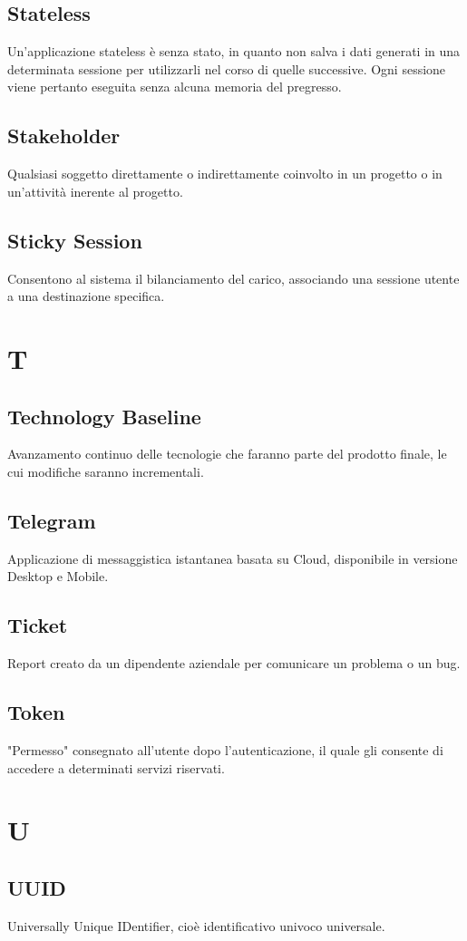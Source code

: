 \subsection{Stateless}
Un’applicazione stateless è senza stato, in quanto non salva i dati generati in una determinata sessione per utilizzarli nel corso di quelle successive. Ogni sessione viene pertanto eseguita senza alcuna memoria del pregresso.
\subsection{Stakeholder}
Qualsiasi soggetto direttamente o indirettamente coinvolto in un progetto o in un'attività inerente al progetto.
\subsection{Sticky Session}
Consentono al sistema il bilanciamento del carico, associando una sessione utente a una destinazione specifica.
\newpage
\section{T}
\subsection{Technology Baseline}
Avanzamento continuo delle tecnologie che faranno parte del prodotto finale, le cui modifiche saranno incrementali.
\subsection{Telegram}
Applicazione di messaggistica istantanea basata su Cloud, disponibile in versione Desktop e Mobile.
\subsection{Ticket}
Report creato da un dipendente aziendale per comunicare un problema o un bug.
\subsection{Token}  
"Permesso" consegnato all'utente dopo l'autenticazione, il quale gli consente di accedere a determinati servizi riservati.
\section{U}
\subsection{UUID}
Universally Unique IDentifier, cioè identificativo univoco universale.
